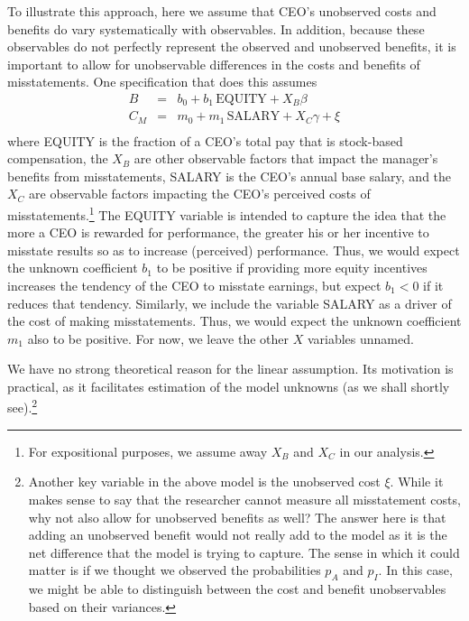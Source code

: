 To illustrate this approach, here we assume that CEO's unobserved costs and benefits do vary systematically with observables.
In addition, because these observables do not perfectly represent the observed and unobserved benefits, it is important to allow for unobservable differences in the costs and benefits of misstatements. 
One specification that does this assumes
\begin{equation}\begin{array}{lcl}\label{eqns1}
B & = & b_0 + b_1 \, \mbox{EQUITY} + X_B\beta\\[.5em]
C_M & = & m_0 + m_1 \, \mbox{SALARY} + X_C\gamma + \xi\\[.5em]
\end{array}
\end{equation}
where EQUITY is the fraction of a CEO's total pay that is stock-based compensation, 
the $X_B$ are other observable factors that impact the manager's benefits from misstatements,
SALARY is the CEO's annual base salary, and the $X_C$ are observable factors impacting the CEO's perceived costs of misstatements.\footnote{
For expositional purposes, we assume away $X_B$ and $X_C$ in our analysis.}
The EQUITY variable is intended to capture the idea that the more a CEO is rewarded for performance, the greater his or her incentive to misstate results so as to increase (perceived) performance.
Thus, we would expect the unknown coefficient $b_1$ to be positive if providing more equity incentives increases the tendency of the CEO to misstate earnings, but expect $b_1 < 0$ if it reduces that tendency.
Similarly, we include the variable SALARY as a driver of the cost of making misstatements.
Thus, we would expect the unknown coefficient $m_1$ also to be positive.
For now, we leave the other $X$ variables unnamed.

We have no strong theoretical reason for the linear assumption. Its motivation is practical, as it facilitates estimation of the model unknowns (as we shall shortly see).\footnote{Another key variable in the above model is the unobserved cost $\xi$.
While it makes sense to say that the researcher cannot measure all misstatement costs, why not also allow for unobserved benefits as well?
The answer here is that adding an unobserved benefit would not really add to the model as it is the net difference that the model is trying to capture.
The sense in which it could matter is if we thought we observed the probabilities $p_A$ and $p_I$.
In this case, we might be able to distinguish between the cost and benefit unobservables based on their variances.}
 
